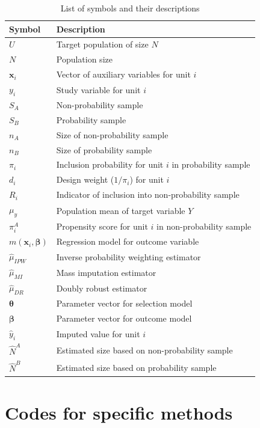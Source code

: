 \documentclass[
]{jss}
\begin{document}
\begin{table}[ht!]
\centering
\begin{tabular}{ll}
\hline
\textbf{Symbol} & \textbf{Description} \\
\hline
$U$ & Target population of size $N$ \\
$N$ & Population size \\
$\boldsymbol{x}_i$ & Vector of auxiliary variables for unit $i$ \\
$y_i$ & Study variable for unit $i$ \\
$S_A$ & Non-probability sample \\
$S_B$ & Probability sample \\
$n_A$ & Size of non-probability sample \\
$n_B$ & Size of probability sample \\
$\pi_i$ & Inclusion probability for unit $i$ in probability sample \\
$d_i$ & Design weight ($1/\pi_i$) for unit $i$ \\
$R_i$ & Indicator of inclusion into non-probability sample \\
$\mu_y$ & Population mean of target variable $Y$ \\
$\pi_i^A$ & Propensity score for unit $i$ in non-probability sample \\
$m(\boldsymbol{x}_i, \boldsymbol{\beta})$ & Regression model for outcome variable \\
$\hat{\mu}_{IPW}$ & Inverse probability weighting estimator \\
$\hat{\mu}_{MI}$ & Mass imputation estimator \\
$\hat{\mu}_{DR}$ & Doubly robust estimator \\
$\boldsymbol{\theta}$ & Parameter vector for selection model \\
$\boldsymbol{\beta}$ & Parameter vector for outcome model \\
$\hat{y}_i$ & Imputed value for unit $i$ \\
$\hat{N}^A$ & Estimated size based on non-probability sample \\
$\hat{N}^B$ & Estimated size based on probability sample \\
\hline
\end{tabular}
\caption{List of symbols and their descriptions}
\label{tab-list-of-sybmols}
\end{table}

\clearpage

\clearpage

\section{Codes for specific methods}\label{sec-examples}
\end{document}

